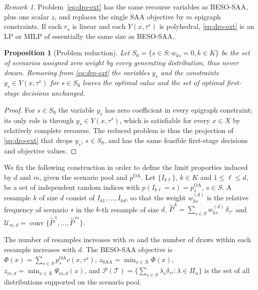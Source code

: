 \documentclass[mnsc,sglanonrev]{informs4}  %
\newtheorem{proposition}{Proposition}
\theoremstyle{remark}\newtheorem{remark}{Remark}
\begin{document}
\begin{APPENDICES}
\begin{remark}
Problem~\eqref{eq:dro-ext} has the same recourse variables as BESO-SAA, plus one scalar $z$, and replaces the single SAA objective by $m$ epigraph constraints. If each $r_s$ is linear and each $Y(x,\tau^s)$ is polyhedral, \eqref{eq:dro-ext} is an LP or MILP of essentially the same size as BESO-SAA. 
\end{remark}

\begin{proposition}[Problem reduction]\label{prop:probred}
Let $S_0=\{s\in S: w_{ks}=0, k\in K\}$ be the set of scenarios assigned zero weight by every generating distribution, thus never drawn. Removing from \eqref{eq:dro-ext} the variables $y_s$ and the constraints $y_s\in Y(x,\tau^s)$ for $s\in S_0$ leaves the optimal value and the set of optimal first-stage decisions unchanged.
\end{proposition}

\begin{proof}
For $s\in S_0$ the variable $y_s$ has zero coefficient in every epigraph constraint; its only role is through $y_s\in Y(x,\tau^s)$, which is satisfiable for every $x\in X$ by relatively complete recourse. The reduced problem is thus the projection of \eqref{eq:dro-ext} that drops $y_s$, $s\in S_0$, and has the same feasible first-stage decisions and objective values.
\end{proof}

We fix the following construction in order to define the limit proporties induced by $d$ and $m$, given the scenario pool and $p^{\mathrm{OA}}$. 
Let $\{I_{k\ell}\}$, $k\in K$ and $1 \leq\ell\leq d$, be a set of independent random indices with $p(I_{k\ell}=s)=p^{\mathrm{OA}}_s$, $s\in S$. A resample $k$ of size $d$ consist of $I_{k1},\ldots,I_{kd}$, so that the weight \(w^{(d)}_{ks}\) is the relative frequency of scenario \(s\) in the \(k\)-th resample of size \(d\), 
$\widehat P^{\,k}=\sum_{s\in S}w^{(d)}_{ks}\,\delta_{\tau^s}$ and $\mathcal U_{m,d}=\operatorname{conv}\{\widehat P^{\,1},\ldots,\widehat P^{\,m}\}$.

The number of resamples increases with $m$ and the number of draws within each resample increases with $d$.
The BESO-SAA objective is $\Phi(x)=\sum_{s\in S}p_s^{\mathrm{OA}}c(x,\tau^s)$, $z_{\mathrm{SAA}}=\min_{x\in X}\Phi(x)$, $z_{m,d}=\min_{x\in X}\Psi_{m,d}(x)$, and $\mathcal P(\mathcal T)=\{\sum_{s\in S}\lambda_s\delta_{\tau^s}:\lambda\in\Pi_n\}$ is the set of all distributions supported on the scenario pool.


\end{APPENDICES}
\end{document}
